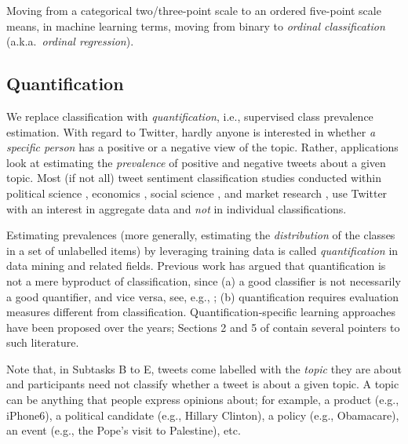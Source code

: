 \documentclass[11pt,letterpaper]{article}
\begin{document}
  Moving from a categorical two/three-point scale to an ordered
  five-point scale means, in machine learning terms, moving from
  binary to \textit{ordinal classification} (a.k.a.\
  \textit{ordinal regression}).

\subsection{Quantification} 

We replace classification with \textit{quantification}, i.e.,
  supervised class prevalence estimation. With regard to Twitter, hardly anyone is
  interested in whether \textit{a specific person} has a positive or a
  negative view of the topic. Rather, applications look at  estimating the \textit{prevalence} of positive
  and negative tweets about a given topic. Most (if not all) tweet sentiment classification studies conducted within political science
  \cite{Borge-Holthoefer:2015dz,Kaya:2013ca,marchettibowick-chambers:2012:EACL2012},
  economics \cite{Bollen:2011bf,OConnor:2010fk}, social science
  \cite{Dodds:2011uq}, and market research
  \cite{Burton:2011sh,Qureshi:2013fb}, use Twitter with an interest in
  aggregate data and \emph{not} in individual classifications.

  Estimating prevalences (more generally, estimating the
  \textit{distribution} of the classes in a set of unlabelled items)
  by leveraging training data is called \textit{quantification} in
  data mining and related fields. Previous work has argued that
  quantification is not a mere byproduct of classification, since (a)
  a good classifier is not necessarily a good quantifier, and vice
  versa, see, e.g., \cite{Forman:2008kx}; (b) quantification requires
  evaluation measures different from classification. Quantification-specific learning approaches have been
  proposed over the years; Sections 2 and 5 of \cite{Esuli:2015gh}
  contain several pointers to such literature.

Note that, in Subtasks B to E, tweets come labelled with the
\textit{topic} they are about and participants need not classify whether a tweet is about a given topic. A
topic can be anything that people express opinions
about; for example, a product (e.g., iPhone6), a political candidate
(e.g., Hillary Clinton), a policy (e.g., Obamacare), an event (e.g.,
the Pope's visit to Palestine), etc.
\end{document}

